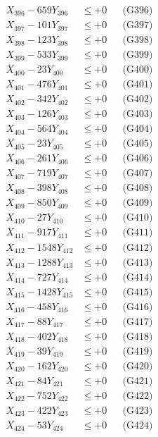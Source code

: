 \documentclass[a4paper,10pt]{article}
\begin{document}
{\begin{align}
X_{396} - 659Y_{396} &\leq +0 && \text{(G396)} \\
X_{397} - 101Y_{397} &\leq +0 && \text{(G397)} \\
X_{398} - 123Y_{398} &\leq +0 && \text{(G398)} \\
X_{399} - 533Y_{399} &\leq +0 && \text{(G399)} \\
X_{400} - 23Y_{400} &\leq +0 && \text{(G400)} \\
\allowbreak
X_{401} - 476Y_{401} &\leq +0 && \text{(G401)} \\
X_{402} - 342Y_{402} &\leq +0 && \text{(G402)} \\
X_{403} - 126Y_{403} &\leq +0 && \text{(G403)} \\
X_{404} - 564Y_{404} &\leq +0 && \text{(G404)} \\
X_{405} - 23Y_{405} &\leq +0 && \text{(G405)} \\
X_{406} - 261Y_{406} &\leq +0 && \text{(G406)} \\
X_{407} - 719Y_{407} &\leq +0 && \text{(G407)} \\
X_{408} - 398Y_{408} &\leq +0 && \text{(G408)} \\
X_{409} - 850Y_{409} &\leq +0 && \text{(G409)} \\
X_{410} - 27Y_{410} &\leq +0 && \text{(G410)} \\
\allowbreak
X_{411} - 917Y_{411} &\leq +0 && \text{(G411)} \\
X_{412} - 1548Y_{412} &\leq +0 && \text{(G412)} \\
X_{413} - 1288Y_{413} &\leq +0 && \text{(G413)} \\
X_{414} - 727Y_{414} &\leq +0 && \text{(G414)} \\
X_{415} - 1428Y_{415} &\leq +0 && \text{(G415)} \\
X_{416} - 458Y_{416} &\leq +0 && \text{(G416)} \\
X_{417} - 88Y_{417} &\leq +0 && \text{(G417)} \\
X_{418} - 402Y_{418} &\leq +0 && \text{(G418)} \\
X_{419} - 39Y_{419} &\leq +0 && \text{(G419)} \\
X_{420} - 162Y_{420} &\leq +0 && \text{(G420)} \\
\allowbreak
X_{421} - 84Y_{421} &\leq +0 && \text{(G421)} \\
X_{422} - 752Y_{422} &\leq +0 && \text{(G422)} \\
X_{423} - 422Y_{423} &\leq +0 && \text{(G423)} \\
X_{424} - 53Y_{424} &\leq +0 && \text{(G424)} \\

\end{align}}
\end{document}
